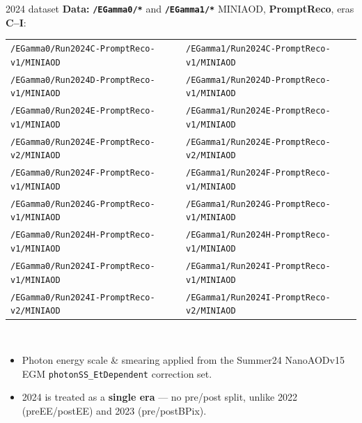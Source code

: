 \documentclass[aspectratio=169,10pt]{beamer}
\newcommand{\hl}[1]{\textcolor{cmsaccent}{\textbf{#1}}}
\newcommand{\gold}[1]{\textcolor{cmsgold}{\textbf{#1}}}
\begin{document}
\begin{frame}{2024 dataset}
  \textbf{Data:} \hl{\texttt{/EGamma0/*}} and \hl{\texttt{/EGamma1/*}} MINIAOD,
  \gold{PromptReco}, eras \gold{C--I}:
  \\[4pt]
  {\footnotesize
  \begin{tabular}{@{}ll@{}}
    \texttt{/EGamma0/Run2024C-PromptReco-v1/MINIAOD} & \texttt{/EGamma1/Run2024C-PromptReco-v1/MINIAOD}\\
    \texttt{/EGamma0/Run2024D-PromptReco-v1/MINIAOD} & \texttt{/EGamma1/Run2024D-PromptReco-v1/MINIAOD}\\
    \texttt{/EGamma0/Run2024E-PromptReco-v1/MINIAOD} & \texttt{/EGamma1/Run2024E-PromptReco-v1/MINIAOD}\\
    \texttt{/EGamma0/Run2024E-PromptReco-v2/MINIAOD} & \texttt{/EGamma1/Run2024E-PromptReco-v2/MINIAOD}\\
    \texttt{/EGamma0/Run2024F-PromptReco-v1/MINIAOD} & \texttt{/EGamma1/Run2024F-PromptReco-v1/MINIAOD}\\
    \texttt{/EGamma0/Run2024G-PromptReco-v1/MINIAOD} & \texttt{/EGamma1/Run2024G-PromptReco-v1/MINIAOD}\\
    \texttt{/EGamma0/Run2024H-PromptReco-v1/MINIAOD} & \texttt{/EGamma1/Run2024H-PromptReco-v1/MINIAOD}\\
    \texttt{/EGamma0/Run2024I-PromptReco-v1/MINIAOD} & \texttt{/EGamma1/Run2024I-PromptReco-v1/MINIAOD}\\
    \texttt{/EGamma0/Run2024I-PromptReco-v2/MINIAOD} & \texttt{/EGamma1/Run2024I-PromptReco-v2/MINIAOD}\\
  \end{tabular}}
  \\[6pt]
  \begin{itemize}\footnotesize
    \item Photon energy scale \& smearing applied from the Summer24 NanoAODv15 EGM
          \texttt{photonSS\_EtDependent} correction set.
    \item 2024 is treated as a \gold{single era} --- no pre/post split, unlike 2022
          (preEE/postEE) and 2023 (pre/postBPix).
  \end{itemize}
\end{frame}
\end{document}
